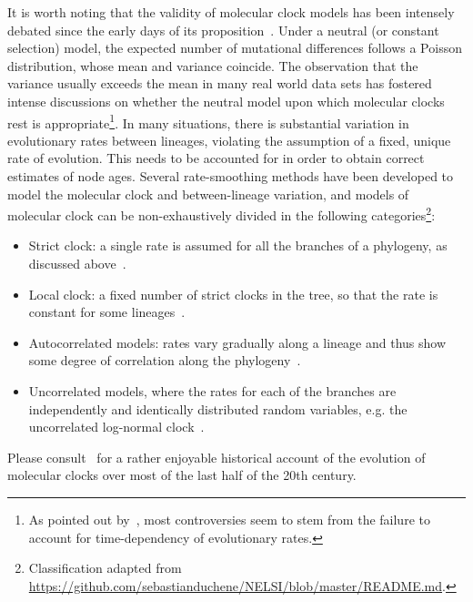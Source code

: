 It is worth noting that the validity of molecular clock models has been intensely debated since the early days of its proposition~\citep{Ayala1999}.
Under a neutral (or constant selection) model, the expected number of mutational differences follows a Poisson distribution, whose mean and variance coincide.
The observation that the variance usually exceeds the mean in many real world data sets has fostered intense discussions on whether the neutral model upon which molecular clocks rest is appropriate\footnote{As pointed out by~\cite{Ho2006}, most controversies seem to stem from the failure to account for time-dependency of evolutionary rates.}.
In many situations, there is substantial variation in evolutionary rates between lineages, violating the assumption of a fixed, unique rate of evolution.
This needs to be accounted for in order to obtain correct estimates of node ages.
Several rate-smoothing methods have been developed to model the molecular clock and between-lineage variation, and models of molecular clock can be non-exhaustively divided in the following categories\citep{Ho2015}\footnote{Classification adapted from \url{https://github.com/sebastianduchene/NELSI/blob/master/README.md}.}:
\begin{itemize}
 \item Strict clock: a single rate is assumed for all the branches of a phylogeny, as discussed above~\citep{Zuckerkandl1962}.
 \item Local clock: a fixed number of strict clocks in the tree, so that the rate is constant for some lineages~\citep{Yoder2000, Drummond2010}.
 \item Autocorrelated models: rates vary gradually along a lineage and thus show some degree of correlation along the phylogeny~\citep{Thorne1998}.
 \item Uncorrelated models, where the rates for each of the branches are independently and identically distributed random variables, e.g. the uncorrelated log-normal clock~\citep{Drummond2006}.
\end{itemize}
Please consult~\cite{Kumar2005} for a rather enjoyable historical account of the evolution of molecular clocks over most of the last half of the 20th century.

